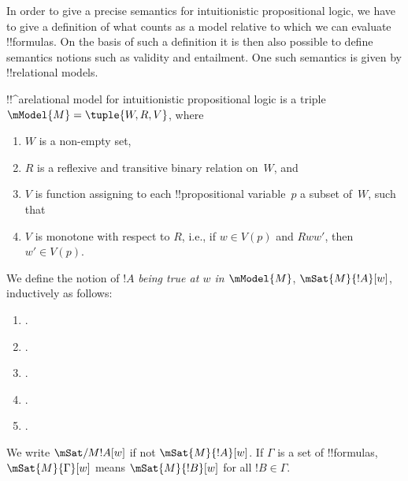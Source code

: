 \documentclass[../../../include/open-logic-section]{subfiles}
\begin{document}


In order to give a precise semantics for intuitionistic propositional
logic, we have to give a definition of what counts as a model relative
to which we can evaluate !!{formula}s. On the basis of such a
definition it is then also possible to define semantics notions such
as validity and entailment. One such semantics is given by
!!{relational model}s.

\begin{defn}
  !!^a{relational model} for intuitionistic propositional logic is a
  triple $\mModel{M} = \tuple{W, R, V}$, where
  \begin{enumerate}
  \item $W$ is a non-empty set,
  \item $R$ is a reflexive and transitive binary relation on~$W$, and
  \item $V$ is function assigning to each !!{propositional
    variable}~$p$ a subset of~$W$, such that
  \item $V$ is monotone with respect to $R$, i.e., if $w
    \in V(p)$ and $Rww'$, then $w' \in V(p)$.
  \end{enumerate}
\end{defn}

\begin{defn}
  We define the notion of $!A$ \emph{being true at $w$ in
    $\mModel{M}$}, $\mSat{M}{!A}[w]$, inductively as follows:
  \begin{enumerate}
  \item {}.
  \item {}.
  \item {}.
  \item {}.
  \item {}.
  \end{enumerate}
  We write $\mSat/{M}{!A}[w]$ if not $\mSat{M}{!A}[w]$. If $\Gamma$ is
  a set of !!{formula}s, $\mSat{M}{\Gamma}[w]$ means $\mSat{M}{!B}[w]$
  for all $!B \in \Gamma$.
\end{defn}
\end{document}
